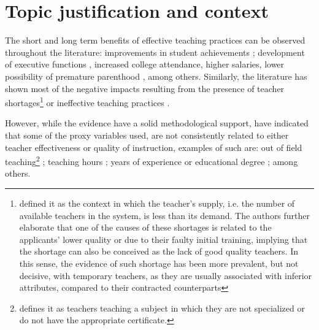 \section{Topic justification and context}

The short and long term benefits of effective teaching practices can be observed throughout the literature: improvements in student achievements \citep{Rockoff_2004, Rivkin_et_al_2005, Duflo_et_al_2009, Hanushek_et_al_2012, Muralidharan_et_al_2013, Chetty_et_al_2014a, Araujo_et_al_2016}; development of executive functions \citep{Araujo_et_al_2016}, increased college attendance, higher salaries, lower possibility of premature parenthood \citep{Chetty_et_al_2014b}, among others. Similarly, the literature has shown most of the negative impacts resulting from the presence of teacher shortages\footnote{\citet{Bertoni_et_al_2020a} defined it as the context in which the teacher's supply, i.e. the number of available teachers in the system, is less than its demand. The authors further elaborate that one of the causes of these shortages is related to the applicants' lower quality or due to their faulty initial training, implying that the shortage can also be conceived as the lack of good quality teachers. In this sense, the evidence of such shortage has been more prevalent, but not decisive, with temporary teachers, as they are usually associated with inferior attributes, compared to their contracted counterparts} \citep{Duflo_et_al_2009, Muralidharan_et_al_2013, Duflo_et_al_2015, Ayala_2017, Marotta_2019} or ineffective teaching practices \citep{Hanushek_et_al_2012}.

However, while the evidence have a solid methodological support, \citet{Hanushek_et_al_2006} have indicated that some of the proxy variables used, are not consistently related to either teacher effectiveness or quality of instruction, examples of such are: out of field teaching\footnote{\citet{Medeiros_et_al_2018} defines it as teachers teaching a subject in which they are not specialized or do not have the appropriate certificate.} \citep{Ingersoll_1998, Dee_et_al_2008, Bertoni_et_al_2020a}; teaching hours \citep{Bruns_et_al_2015}; years of experience or educational degree \citep{Rockoff_2004, Rivkin_et_al_2005, Clotfelter_et_al_2006, Clotfelter_et_al_2007, Hanushek_et_al_2012}; among others.

